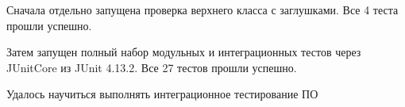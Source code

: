 \documentclass{mietlab}
\begin{document}
\Needspace{156bp}


\Needspace{520bp}

Сначала отдельно запущена проверка верхнего класса с заглушками. Все 4 теста прошли успешно.\par

\Needspace{117bp}


Затем запущен полный набор модульных и интеграционных тестов через JUnitCore из JUnit 4.13.2. Все 27 тестов прошли успешно.\par

\Needspace{117bp}



Удалось научиться выполнять интеграционное тестирование ПО\par
\end{document}
